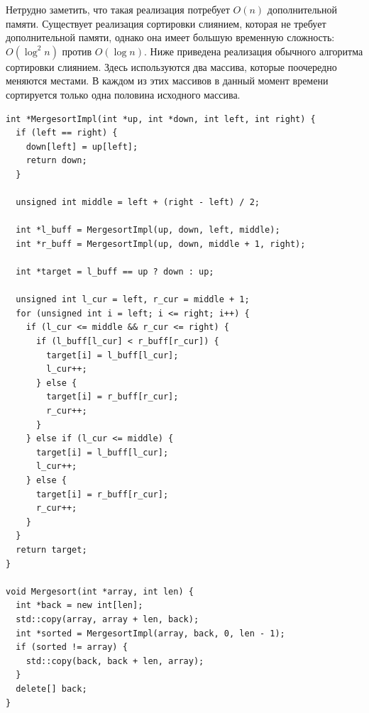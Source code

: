 Нетрудно заметить, что такая реализация потребует $O(n)$ дополнительной памяти.
Существует реализация сортировки слиянием, которая не требует дополнительной памяти,
однако она имеет большую временную сложность: $O(\log^2 n)$ против $O(\log n)$.
Ниже приведена реализация обычного алгоритма сортировки слиянием. Здесь используются
два массива, которые поочередно меняются местами. В каждом из этих массивов
в данный момент времени сортируется только одна половина исходного массива.

\begin{verbatim}
int *MergesortImpl(int *up, int *down, int left, int right) {
  if (left == right) {
    down[left] = up[left];
    return down;
  }

  unsigned int middle = left + (right - left) / 2;

  int *l_buff = MergesortImpl(up, down, left, middle);
  int *r_buff = MergesortImpl(up, down, middle + 1, right);

  int *target = l_buff == up ? down : up;

  unsigned int l_cur = left, r_cur = middle + 1;
  for (unsigned int i = left; i <= right; i++) {
    if (l_cur <= middle && r_cur <= right) {
      if (l_buff[l_cur] < r_buff[r_cur]) {
        target[i] = l_buff[l_cur];
        l_cur++;
      } else {
        target[i] = r_buff[r_cur];
        r_cur++;
      }
    } else if (l_cur <= middle) {
      target[i] = l_buff[l_cur];
      l_cur++;
    } else {
      target[i] = r_buff[r_cur];
      r_cur++;
    }
  }
  return target;
}

void Mergesort(int *array, int len) {
  int *back = new int[len];
  std::copy(array, array + len, back);
  int *sorted = MergesortImpl(array, back, 0, len - 1);
  if (sorted != array) {
    std::copy(back, back + len, array);
  }
  delete[] back;
}
\end{verbatim}